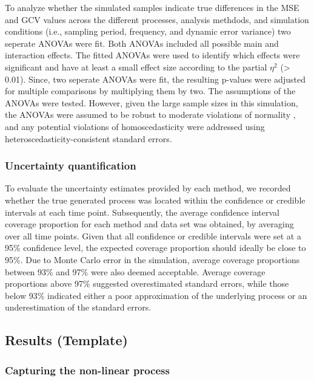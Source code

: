 \documentclass[man, floatsintext]{apa7}
\begin{document}
To analyze whether the simulated samples indicate true differences in the
MSE and GCV values across the different processes, analysis methdods, and
simulation conditions (i.e., sampling period, frequency, and dynamic error
variance) two seperate ANOVAs were fit. Both ANOVAs included all possible main
and interaction effects. The fitted ANOVAs were used to identify which effects
were significant and have at least a small effect size according to the partial
$\eta^2$ (> 0.01). Since, two seperate ANOVAs were fit, the resulting p-values
were adjusted for multiple comparisons by multiplying them by two. The
assumptions of the ANOVAs were tested. However, given the large sample sizes in
this simulation, the ANOVAs were assumed to be robust to moderate violations of
normality \parencite{blanca_non-normal_2017}, and any potential violations of
homoscedasticity were addressed using heteroscedasticity-consistent standard
errors.

\subsubsection{Uncertainty quantification}

To evaluate the uncertainty estimates provided by each method, we recorded
whether the true generated process was located within the confidence or
credible intervals at each time point. Subsequently, the average confidence
interval coverage proportion for each method and data set was obtained, by
averaging over all time points. Given that all confidence or credible intervals
were set at a 95\% confidence level, the expected coverage proportion should
ideally be close to 95\%. Due to Monte Carlo error in the simulation, average
coverage proportions between 93\% and 97\% were also deemed acceptable. Average
coverage proportions above 97\% suggested overestimated standard errors, while
those below 93\% indicated either a poor approximation of the underlying
process or an underestimation of the standard errors.

\subsection{Results (Template)}

\subsubsection{Capturing the non-linear process}
\end{document}

